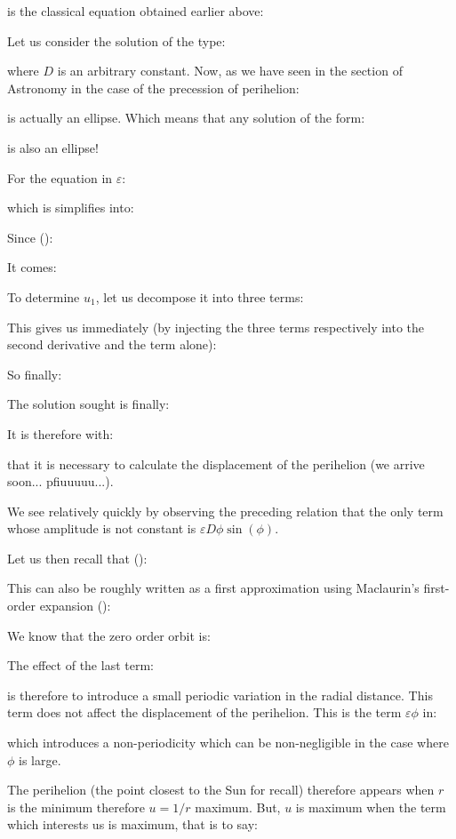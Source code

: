 	is the classical equation obtained earlier above:
	
	Let us consider the solution of the type:
	
	where $D$ is an arbitrary constant. Now, as we have seen in the section of Astronomy in the case of the precession of perihelion:
	
	is actually an ellipse. Which means that any solution of the form:
	
	is also an ellipse!
	
	For the equation in $\varepsilon$:
	
	which is simplifies into:
	
	Since ():
	
	It comes:
	
	To determine $u_1$, let us decompose it into three terms:
	
	This gives us immediately (by injecting the three terms respectively into the second derivative and the term alone):
	
	So finally:
	
	The solution sought is finally:
	
	It is therefore with:
	
	that it is necessary to calculate the displacement of the perihelion (we arrive soon... pfiuuuuu...).
	
	We see relatively quickly by observing the preceding relation that the only term whose amplitude is not constant is $\varepsilon D\phi\sin(\phi)$.

	Let us then recall that ():
	
	This can also be roughly written as a first approximation using Maclaurin's first-order expansion ():
	
	We know that the zero order orbit is:
	
	The effect of the last term:
	
	is therefore to introduce a small periodic variation in the radial distance. This term does not affect the displacement of the perihelion. This is the term $\varepsilon\phi$ in:
	
	which introduces a non-periodicity which can be non-negligible in the case where $\phi$ is large.
	
	The perihelion (the point closest to the Sun for recall) therefore appears when $r$ is the minimum therefore $u=1/r$ maximum. But, $u$ is maximum when the term which interests us is maximum, that is to say:
	
